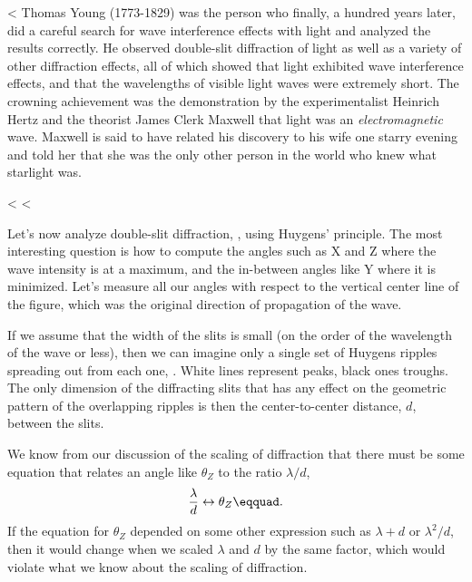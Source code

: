 <%
Thomas Young (1773-1829) was the person
who finally, a hundred years later, did a careful search for
wave interference effects with light and analyzed the
results correctly. He observed double-slit diffraction of
light as well as a variety of other diffraction effects, all
of which showed that light exhibited wave interference
effects, and that the wavelengths of visible light waves
were extremely short. The crowning achievement was the
demonstration by the experimentalist Heinrich Hertz and the theorist James Clerk
Maxwell that light was an
\emph{electromagnetic} wave. Maxwell is said to have related
his discovery to his wife one starry evening and told her
that she was the only other person in the world who knew what starlight was.

<%
<%

Let's now analyze double-slit diffraction, , using
Huygens' principle. The most interesting question is how to
compute the angles such as X and Z where the wave
intensity is at a maximum, and the in-between angles like
Y where it is minimized. Let's measure all our angles
with respect to the vertical center line of the figure,
which was the original direction of propagation of the wave.

If we assume that the width of the slits is small (on the
order of the wavelength of the wave or less), then we can
imagine only a single set of Huygens ripples spreading out
from each one, .  White lines represent peaks, black
ones troughs. The only dimension of the diffracting
slits that has any effect on the geometric pattern of the
overlapping ripples is then the center-to-center distance,
$d$, between the slits.

We know from our discussion of the scaling of diffraction
that there must be some equation that relates an angle like
$\theta_Z$ to the ratio $\lambda /d$,
\begin{equation*}
        \frac{\lambda}{d} \leftrightarrow \theta_Z\eqquad.
\end{equation*}
If the equation for $\theta_Z$ depended on some other
expression such as $\lambda +d$ or $\lambda^2/d$, then it
would change when we scaled $\lambda $ and $d$ by the same
factor, which would violate what we know about the
scaling of diffraction.

